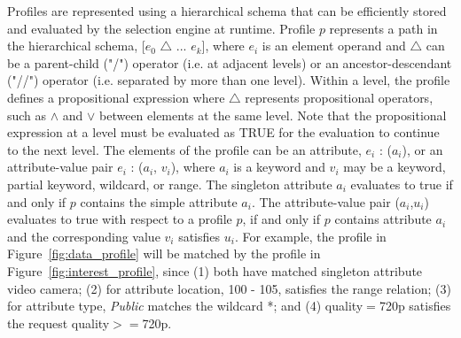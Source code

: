 Profiles are represented using a hierarchical schema that can be efficiently stored and evaluated by the selection engine at runtime. Profile $p$ represents a path in the hierarchical schema, [$e_0$ $\bigtriangleup$ ... $e_k$], where $e_i$ is an element operand and $\bigtriangleup$ can be a parent-child ("/") operator (i.e. at adjacent levels) or an ancestor-descendant ("//") operator (i.e. separated by more than one level). Within a level, the profile defines a propositional expression where $\bigtriangleup$ represents propositional operators, such as $\wedge$ and $\vee$ between elements at the same level. Note that the propositional expression at a level must be evaluated as TRUE for the evaluation to continue to the next level. The elements of the profile can be an attribute, $e_i$ : ($a_i$), or an attribute-value pair $e_i$ : ($a_i$, $v_i$), where $a_i$ is a keyword and $v_i$ may be a keyword, partial keyword, wildcard, or range. The singleton attribute $a_i$ evaluates to true if and only if $p$ contains the simple attribute $a_i$. The attribute-value pair ($a_i$,$u_i$) evaluates to true with respect to a profile $p$, if and only if $p$ contains attribute $a_i$ and the corresponding value $v_i$ satisfies $u_i$. For example, the profile in Figure~\ref{fig:data_profile} will be matched by the profile in Figure~\ref{fig:interest_profile}, since (1) both have matched singleton attribute video camera; (2) for attribute location, 100 - 105, satisfies the range relation; (3) for attribute type, {\it Public} matches the wildcard *; and (4) quality$=$720p satisfies the request quality$>=$720p. 
\\
